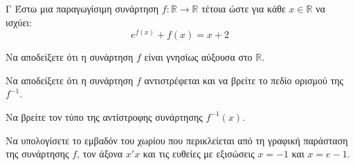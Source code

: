\begin{thema}{Γ}
Έστω μια παραγωγίσιμη συνάρτηση $f: \mathbb{R} \to \mathbb{R}$ τέτοια ώστε για κάθε $x \in \mathbb{R}$ να ισχύει:
$$ e^{f(x)} + f(x) = x + 2 $$
\begin{erwthma}
  \item Να αποδείξετε ότι η συνάρτηση $f$ είναι γνησίως αύξουσα στο $\mathbb{R}$.
  \item Να αποδείξετε ότι η συνάρτηση $f$ αντιστρέφεται και να βρείτε το πεδίο ορισμού της $f^{-1}$.
  \item Να βρείτε τον τύπο της αντίστροφης συνάρτησης $f^{-1}(x)$.
  \item Να υπολογίσετε το εμβαδόν του χωρίου που περικλείεται από τη γραφική παράσταση της συνάρτησης $f$, τον άξονα $x'x$ και τις ευθείες με εξισώσεις $x = -1$ και $x = e - 1$.
\end{erwthma}
\end{thema}
